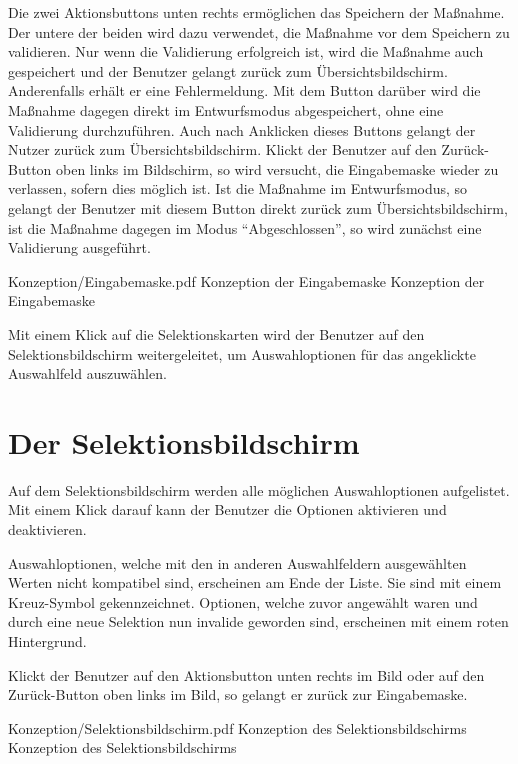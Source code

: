 Die zwei Aktionsbuttons unten rechts ermöglichen das Speichern der Maßnahme.
Der untere der beiden wird dazu verwendet,
die Maßnahme vor dem Speichern zu validieren.
Nur wenn die Validierung erfolgreich ist,
wird die Maßnahme auch gespeichert und der Benutzer gelangt zurück zum Übersichtsbildschirm.
Anderenfalls erhält er eine Fehlermeldung.
Mit dem Button darüber wird die Maßnahme dagegen direkt im Entwurfsmodus abgespeichert,
ohne eine Validierung durchzuführen.
Auch nach Anklicken dieses Buttons gelangt der Nutzer zurück zum Übersichtsbildschirm.
Klickt der Benutzer auf den Zurück-Button oben links im Bildschirm,
so wird versucht,
die Eingabemaske wieder zu verlassen,
sofern dies möglich ist.
Ist die Maßnahme im Entwurfsmodus,
so gelangt der Benutzer mit diesem Button direkt zurück zum Übersichtsbildschirm,
ist die Maßnahme dagegen im Modus \enquote{Abgeschlossen},
so wird zunächst eine Validierung ausgeführt.

\begin{alexfigure}{Konzeption/Eingabemaske.pdf}
  {Konzeption der Eingabemaske}
  {Konzeption der Eingabemaske}

  \label{fig:KonzeptionEingabemaske}

\end{alexfigure}

Mit einem Klick auf die Selektionskarten wird der Benutzer auf den Selektionsbildschirm weitergeleitet, 
um Auswahloptionen für das angeklickte Auswahlfeld auszuwählen.

\section{Der Selektionsbildschirm}

Auf dem Selektionsbildschirm \Abb{\ref{fig:KonzeptionSelektionsbildschirm}} werden alle möglichen Auswahloptionen aufgelistet.
Mit einem Klick darauf kann der Benutzer die Optionen aktivieren und deaktivieren.

Auswahloptionen, welche mit den in anderen Auswahlfeldern ausgewählten Werten nicht kompatibel sind,
erscheinen am Ende der Liste. Sie sind mit einem Kreuz-Symbol gekennzeichnet.
Optionen, welche zuvor angewählt waren und durch eine neue Selektion nun invalide geworden sind,
erscheinen mit einem roten Hintergrund.


Klickt der Benutzer auf den Aktionsbutton unten rechts im Bild oder auf den Zurück-Button oben links im Bild,
so gelangt er zurück zur Eingabemaske.

\begin{alexfigure}{Konzeption/Selektionsbildschirm.pdf}
  {Konzeption des Selektionsbildschirms}
  {Konzeption des Selektionsbildschirms}

  \label{fig:KonzeptionSelektionsbildschirm}

\end{alexfigure}